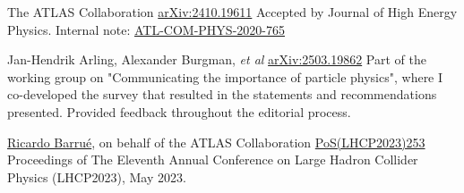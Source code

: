 
\begin{cventries}
    {The ATLAS Collaboration}{}
    {\href{https://arxiv.org/abs/2410.19611}{arXiv:2410.19611}}
    {
        Accepted by Journal of High Energy Physics. Internal note: \href{https://cds.cern.ch/record/2743096}{ATL-COM-PHYS-2020-765}
    }    
\end{cventries}\vspace*{2mm}

\begin{cventries}
    {Jan-Hendrik Arling, Alexander Burgman, \textit{et al}}{}
    {\href{https://arxiv.org/pdf/2503.19862}{arXiv:2503.19862}}
    {
        Part of the working group on "Communicating the importance of particle physics", where I co-developed the survey that resulted in the statements and recommendations presented. Provided feedback throughout the editorial process.
    }    
\end{cventries}\vspace*{2mm}




\begin{cventries}
    {\underline{Ricardo Barrué}, on behalf of the ATLAS Collaboration}{}
    {\href{https://pos.sissa.it/450/253/}{PoS(LHCP2023)253}}
    {
        Proceedings of The Eleventh Annual Conference on Large Hadron Collider Physics (LHCP2023), May 2023.
    }
\end{cventries}\vspace*{2mm}


